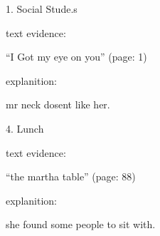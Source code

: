
1. Social Stude.s

text evidence:

``I Got my eye on you'' (page: 1)

explanition:

mr neck dosent like her.

4. Lunch

text evidence:

``the martha table'' (page: 88)

explanition:

she found some people to sit with.


